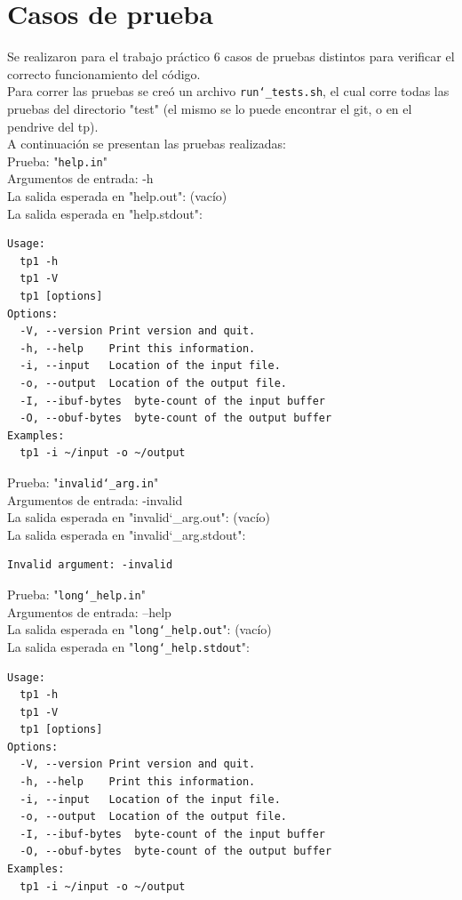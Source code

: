 \documentclass[a4paper,10pt]{article}
\begin{document}
    \section{Casos de prueba}
Se realizaron para el trabajo práctico 6 casos de pruebas distintos para verificar el correcto funcionamiento del código.\\
Para correr las pruebas se creó un archivo \texttt{run\char`_tests.sh}, el cual corre todas las pruebas del directorio "test" (el mismo se lo puede encontrar el git, o en el pendrive del tp).\\
A continuación se presentan las pruebas realizadas:\\

Prueba: "\texttt{help.in}" \\
    Argumentos de entrada: -h\\
    La salida esperada en "help.out": (vacío)\\
    La salida esperada en "help.stdout":
        \begin{Verbatim}
Usage:
  tp1 -h
  tp1 -V
  tp1 [options]
Options:
  -V, --version	Print version and quit.
  -h, --help	Print this information.
  -i, --input	Location of the input file.
  -o, --output	Location of the output file.
  -I, --ibuf-bytes	byte-count of the input buffer
  -O, --obuf-bytes	byte-count of the output buffer
Examples:
  tp1 -i ~/input -o ~/output

  \end{Verbatim}
      
Prueba: "\texttt{invalid\char`_arg.in}" \\
    Argumentos de entrada: -invalid\\
    La salida esperada en "invalid\char`_arg.out": (vacío)\\
    La salida esperada en "invalid\char`_arg.stdout":
        \begin{Verbatim}
Invalid argument: -invalid
  \end{Verbatim}
  
  Prueba: "\texttt{long\char`_help.in}" \\
    Argumentos de entrada: --help\\
    La salida esperada en "\texttt{long\char`_help.out}": (vacío)\\
    La salida esperada en "\texttt{long\char`_help.stdout}":
        \begin{Verbatim}
Usage:
  tp1 -h
  tp1 -V
  tp1 [options]
Options:
  -V, --version	Print version and quit.
  -h, --help	Print this information.
  -i, --input	Location of the input file.
  -o, --output	Location of the output file.
  -I, --ibuf-bytes	byte-count of the input buffer
  -O, --obuf-bytes	byte-count of the output buffer
Examples:
  tp1 -i ~/input -o ~/output

  \end{Verbatim}
  
\end{document}
